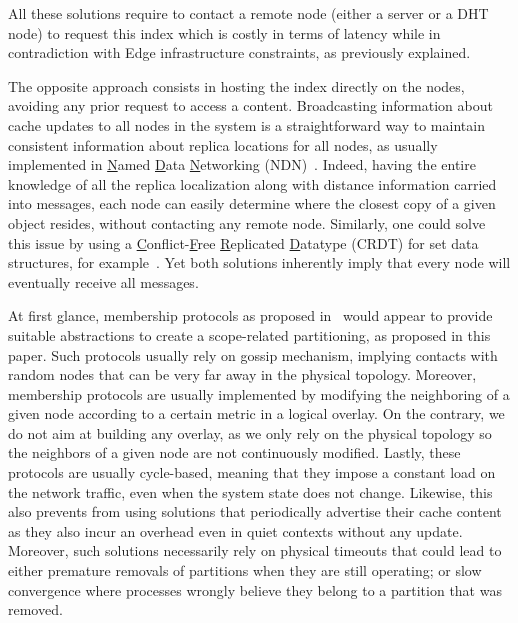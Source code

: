 All these solutions require to contact a remote node (either a server
or a DHT node) to request this index which is costly in terms of
latency while in contradiction with Edge infrastructure constraints,
as previously explained.


The opposite approach consists in hosting the index directly on the
nodes, avoiding any prior request to access a content.
Broadcasting information about cache updates to all nodes in the
system is a straightforward way to maintain consistent information
about replica locations for all nodes, as usually implemented in
\underline{N}amed \underline{D}ata \underline{N}etworking
(NDN)~\cite{nlsr}.  Indeed, having the entire knowledge of all the
replica localization along with distance information carried into
messages, each node can easily determine where the closest copy of a
given object resides, without contacting any remote node.  Similarly,
one could solve this issue by using a
\underline{C}onflict-\underline{F}ree \underline{R}eplicated
\underline{D}atatype (CRDT) for set data structures, for
example~\cite{shapiro2011crdts}. Yet both solutions inherently imply
that every node will eventually receive all messages.


At first glance, membership protocols as proposed in~\cite{t-man}
would appear to provide suitable abstractions to create a
scope-related partitioning, as proposed in this paper. Such protocols
usually rely on gossip mechanism, implying contacts with random nodes
that can be very far away in the physical topology. Moreover,
membership protocols are usually implemented by modifying the
neighboring of a given node according to a certain metric in a logical
overlay.  On the contrary, we do not aim at building any overlay, as
we only rely on the physical topology so the neighbors of a given node
are not continuously modified. Lastly, these protocols are usually
cycle-based, meaning that they impose a constant load on the network
traffic, even when the system state does not change. Likewise, this
also prevents from using solutions that periodically advertise their
cache content~\cite{garcia-lopez, hemmati2015namebased} as they also
incur an overhead even in quiet contexts without any update.
Moreover, such solutions necessarily rely on physical timeouts that
could lead to either premature removals of partitions when they are
still operating; or slow convergence where processes wrongly believe
they belong to a partition that was removed.



